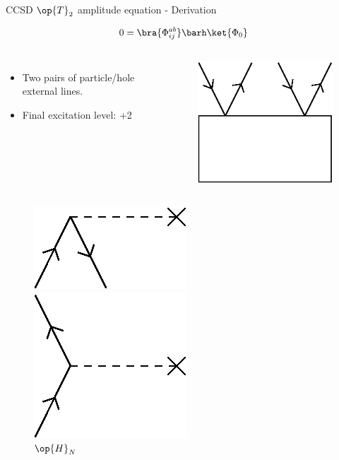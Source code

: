 \begin{frame}{CCSD $\op{T}_2$ amplitude equation - Derivation }

    \begin{equation*}
        0 = \bra{\Phi_{ij}^{ab}} \barh \ket{\Phi_0}
    \end{equation*}
    \begin{columns}
    \begin{itemize}
        \item Two pairs of particle/hole  external lines.
        \item Final excitation level: +2
    \end{itemize}
    \begin{figure}
        \centering
        \includegraphics[scale=0.45]{graphics/t2amp_diag}
    \end{figure}
    \end{columns}
    \renewcommand{\figurename}{Elements}
    \begin{columns}[t]
    \begin{figure}
        \caption{$\op{H}_N$}
        \centering
        \parbox{0.20\textwidth}{
            \centering
            \includegraphics[scale=0.35]{graphics/f1}} 
        \parbox{0.20\textwidth}{
            \centering
            \includegraphics[scale=0.35]{graphics/f2}} 

\end{figure}
\end{columns}
\end{frame}
